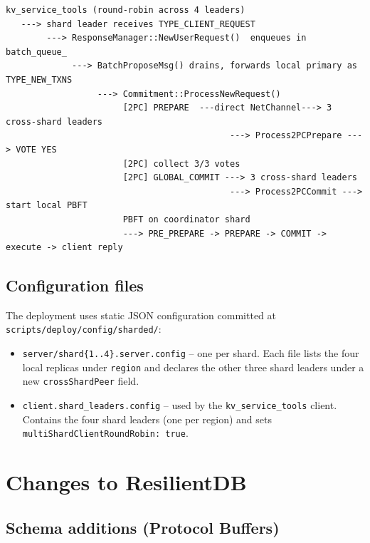 \documentclass[11pt]{article}
\begin{document}
\begin{lstlisting}[style=shstyle,caption={High-level flow of a single SET transaction.}]
kv_service_tools (round-robin across 4 leaders)
   ---> shard leader receives TYPE_CLIENT_REQUEST
        ---> ResponseManager::NewUserRequest()  enqueues in batch_queue_
             ---> BatchProposeMsg() drains, forwards local primary as TYPE_NEW_TXNS
                  ---> Commitment::ProcessNewRequest()
                       [2PC] PREPARE  ---direct NetChannel---> 3 cross-shard leaders
                                            ---> Process2PCPrepare ---> VOTE YES
                       [2PC] collect 3/3 votes
                       [2PC] GLOBAL_COMMIT ---> 3 cross-shard leaders
                                            ---> Process2PCCommit ---> start local PBFT
                       PBFT on coordinator shard
                       ---> PRE_PREPARE -> PREPARE -> COMMIT -> execute -> client reply
\end{lstlisting}

\subsection{Configuration files}

The deployment uses static JSON configuration committed at
\texttt{scripts/deploy/config/sharded/}:

\begin{itemize}[itemsep=2pt]
  \item \texttt{server/shard\{1..4\}.server.config} -- one per shard. Each file
        lists the four local replicas under \texttt{region} and declares the
        other three shard leaders under a new \texttt{crossShardPeer} field.
  \item \texttt{client.shard\_leaders.config} -- used by the
        \texttt{kv\_service\_tools} client. Contains the four shard leaders
        (one per region) and sets
        \texttt{multiShardClientRoundRobin: true}.
\end{itemize}

\section{Changes to ResilientDB}

\subsection{Schema additions (Protocol Buffers)}
\end{document}
